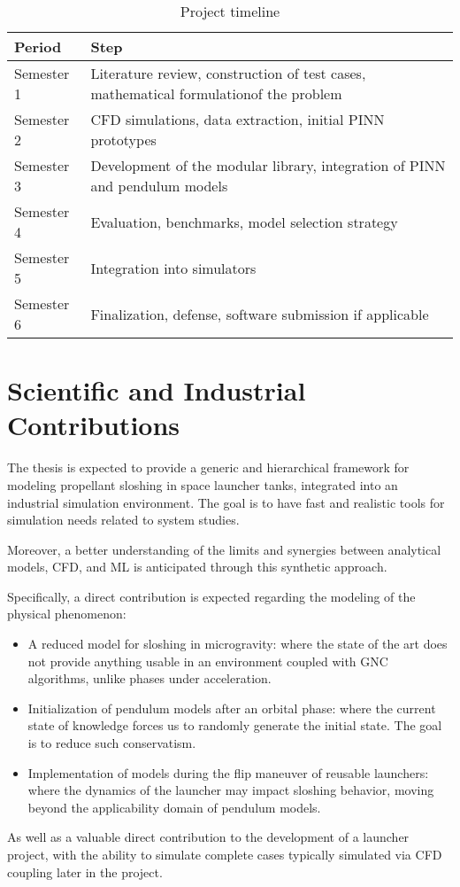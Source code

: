 \documentclass[12pt]{article}
\begin{document}
	\begin{table}[h]
		\centering
		\begin{tabularx}{\textwidth}{l X}
			
			\hline
			
			Period & Step \\
			
			\hline
			
			Semester 1 & Literature review, construction of test cases, mathematical formulationof the problem \\
			Semester 2 & CFD simulations, data extraction, initial PINN prototypes \\
			Semester 3 & Development of the modular library, integration of PINN and pendulum models \\
			Semester 4 & Evaluation, benchmarks, model selection strategy \\
			Semester 5 & Integration into simulators \\
			Semester 6 & Finalization, defense, software submission if applicable \\
			
			\hline
			
		\end{tabularx}
		\caption{Project timeline}
	\end{table}	
	
	\section*{Scientific and Industrial Contributions}
	
	The thesis is expected to provide a generic and hierarchical framework for modeling propellant sloshing in space launcher tanks, integrated into an industrial simulation environment. The goal is to have fast and realistic tools for simulation needs related to system studies.
	
	Moreover, a better understanding of the limits and synergies between analytical models, CFD, and ML is anticipated through this synthetic approach.
	
	Specifically, a direct contribution is expected regarding the modeling of the physical phenomenon:
	\begin{itemize}
		\item A reduced model for sloshing in microgravity: where the state of the art does not provide anything usable in an environment coupled with GNC algorithms, unlike phases under acceleration.
		\item Initialization of pendulum models after an orbital phase: where the current state of knowledge forces us to randomly generate the initial state. The goal is to reduce such conservatism.
		\item Implementation of models during the flip maneuver of reusable launchers: where the dynamics of the launcher may impact sloshing behavior, moving beyond the applicability domain of pendulum models.
	\end{itemize}
	As well as a valuable direct contribution to the development of a launcher project, with the ability to simulate complete cases typically simulated via CFD coupling later in the project.
	
\end{document}
